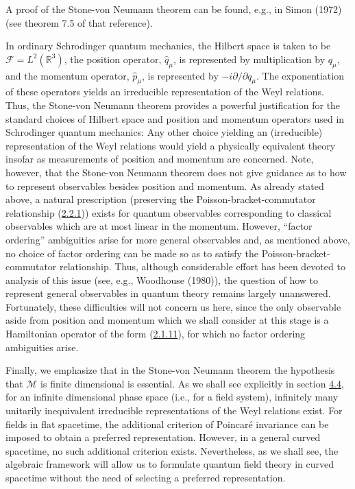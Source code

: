 \documentclass[11pt,a4paper]{article}
\begin{document}
A proof of the Stone-von Neumann theorem can be found, e.g., in Simon (1972) (see theorem 7.5 of that reference).

In ordinary Schrodinger quantum mechanics, the Hilbert space is taken to be \(\mathcal{F}=L^2(\mathbb{R}^3)\), the position operator, \(\hat{q}_{\mu}\), is represented by multiplication by \(q_{\mu}\), and the momentum operator, \(\hat{p}_{\mu}\), is represented by \(-i \partial/\partial q_\mu\). The exponentiation of these operators yields an irreducible representation of the Weyl relations. Thus, the Stone-von Neumann theorem provides a powerful justification for the standard choices of Hilbert space and position and momentum operators used in Schrodinger quantum mechanics: Any other choice yielding an (irreducible) representation of the Weyl relations would yield a physically equivalent theory insofar as measurements of position and momentum are concerned. Note, however, that the Stone-von Neumann theorem does not give guidance as to how to represent observables besides position and momentum. As already stated above, a natural prescription (preserving the Poisson-bracket-commutator relationship (\hyperref[eq:2.2.1]{2.2.1})) exists for quantum observables corresponding to classical observables which are at most linear in the momentum. However, ``factor ordering'' ambiguities arise for more general observables and, as mentioned above, no choice of factor ordering can be made so as to satisfy the Poisson-bracket-commutator relationship. Thus, although considerable effort has been devoted to analysis of this issue (see, e.g., Woodhouse (1980)), the question of how to represent general observables in quantum theory remains largely unanswered. Fortunately, these difficulties will not concern us here, since the only observable aside from position and momentum which we shall consider at this stage is a Hamiltonian operator of the form (\hyperref[eq:2.1.11]{2.1.11}), for which no factor ordering ambiguities arise.

Finally, we emphasize that in the Stone-von Neumann theorem the hypothesis that \(\mathcal{M}\) is finite dimensional is essential. As we shall see explicitly in section \hyperlink{sec:4.4}{4.4}, for an infinite dimensional phase \hypertarget{source-34}{} space (i.e., for a field system), infinitely many unitarily inequivalent irreducible representations of the Weyl relations exist. For fields in flat spacetime, the additional criterion of Poincaré invariance can be imposed to obtain a preferred representation. However, in a general curved spacetime, no such additional criterion exists. Nevertheless, as we shall see, the algebraic framework will allow us to formulate quantum field theory in curved spacetime without the need of selecting a preferred representation.
\end{document}

